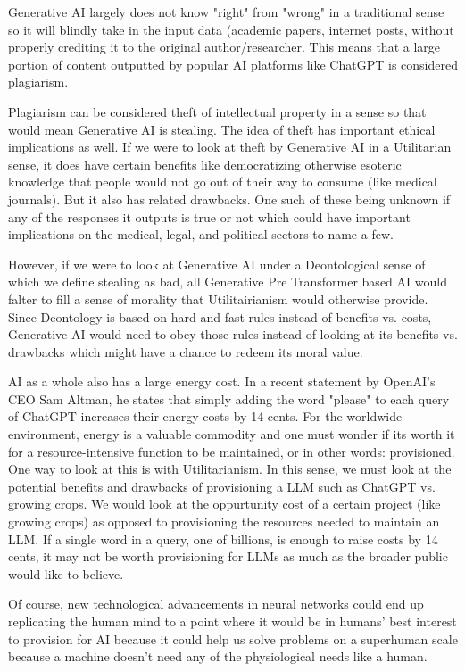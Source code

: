 \documentclass[letterpaper,11pt,leqno]{article}
\begin{document}
Generative AI largely does not know "right" from "wrong" in a traditional sense so it will blindly take in the input data (academic papers, internet posts, without properly crediting it to the original author/researcher. This means that a large portion of content outputted by popular AI platforms like ChatGPT is considered plagiarism.

Plagiarism can be considered theft of intellectual property in a sense so that would mean Generative AI is stealing. The idea of theft has important ethical implications as well. If we were to look at theft by Generative AI in a Utilitarian sense, it does have certain benefits like democratizing otherwise esoteric knowledge that people would not go out of their way to consume (like medical journals). But it also has related drawbacks. One such of these being unknown if any of the responses it outputs is true or not which could have important implications on the medical, legal, and political sectors to name a few.

However, if we were to look at Generative AI under a Deontological sense of which we define stealing as bad, all Generative Pre Transformer based AI would falter to fill a sense of morality that Utilitairianism would otherwise provide. Since Deontology is based on hard and fast rules instead of benefits vs. costs, Generative AI would need to obey those rules instead of looking at its benefits vs. drawbacks which might have a chance to redeem its moral value.

AI as a whole also has a large energy cost. In a recent statement by OpenAI's CEO Sam Altman, he states that simply adding the word "please" to each query of ChatGPT increases their energy costs by 14 cents. For the worldwide environment, energy is a valuable commodity and one must wonder if its worth it for a resource-intensive function to be maintained, or in other words: provisioned. One way to look at this is with Utilitarianism. In this sense, we must look at the potential benefits and drawbacks of provisioning a LLM such as ChatGPT vs. growing crops. We would look at the oppurtunity cost of a certain project (like growing crops) as opposed to provisioning the resources needed to maintain an LLM. If a single word in a query, one of billions, is enough to raise costs by 14 cents, it may not be worth provisioning for LLMs as much as the broader public would like to believe.

Of course, new technological advancements in neural networks could end up replicating the human mind to a point where it would be in humans' best interest to provision for AI because it could help us solve problems on a superhuman scale because a machine doesn't need any of the physiological needs like a human.
\end{document}
